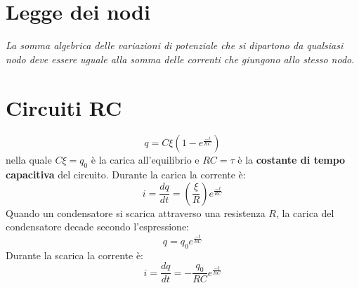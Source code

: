     \section*{Legge dei nodi} \textit{La somma algebrica delle variazioni di 
    potenziale che si dipartono da qualsiasi nodo deve essere uguale alla somma
    delle correnti che giungono allo stesso nodo}.

    \section*{Circuiti RC}
        \begin{equation*}
            q = C\xi(1-e^{\frac{-t}{RC}})
        \end{equation*}
    nella quale $C\xi = q_0$ è la carica all'equilibrio e $RC = \tau$ è la 
    \textbf{costante di tempo capacitiva} del circuito. Durante la carica la 
    corrente è:
        \begin{equation*}
            i = \frac{dq}{dt} = (\frac{\xi}{R})e^{\frac{-t}{RC}}
        \end{equation*}
    Quando un condensatore si scarica attraverso una resistenza $R$, la carica
    del condensatore decade secondo l'espressione:
        \begin{equation*}
            q = q_0e^{\frac{-t}{RC}}
        \end{equation*}
    Durante la scarica la corrente è:
        \begin{equation*}
            i = \frac{dq}{dt} = -\frac{q_0}{RC}e^{\frac{-t}{RC}}
        \end{equation*}
